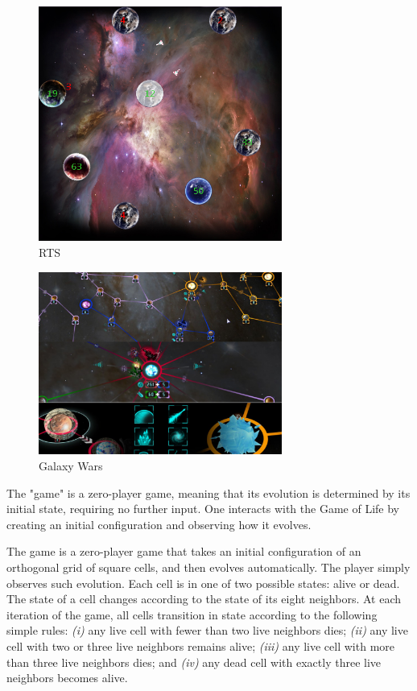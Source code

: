 \begin{figure}
\begin{center}
\includegraphics[width=8cm]{Pics/rts.png}
\end{center}
\caption{RTS}
\label{fig:rts}
\end{figure}

\begin{figure}
\begin{center}
\includegraphics[width=8cm]{Pics/galaxy_wars.png}
\end{center}
\caption{Galaxy Wars}
\label{fig:galaxy_wars}
\end{figure}

The "game" is a zero-player game, meaning that its evolution is determined by its initial state, requiring no further input. One interacts with the Game of Life by creating an initial configuration and observing how it evolves.

The game is a zero-player game that takes an initial configuration of an orthogonal grid of square cells, and then evolves automatically. The player simply observes such evolution. Each cell is in one of two possible states: alive or dead. The state of a cell changes according to the state of its eight neighbors. At each iteration of the game, all cells transition in state according to the following simple rules: \textit{(i)} any live cell with fewer than two live neighbors dies; \textit{(ii)} any live cell with two or three live neighbors remains alive; \textit{(iii)} any live cell with more than three live neighbors dies; and \textit{(iv)} any dead cell with exactly three live neighbors becomes alive.

